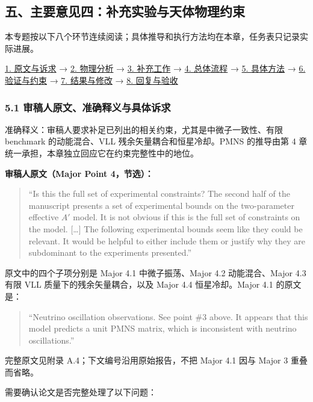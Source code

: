 \documentclass[
  chinese,
  UTF8]{ctexart}
\begin{document}
\subsection{五、主要意见四：补充实验与天体物理约束}\label{major-4}

本专题按以下八个环节连续阅读；具体推导和执行方法均在本章，任务表只记录实际进展。

\hyperref[major-4-step-1]{1. 原文与诉求} → \hyperref[major-4-step-2]{2.
物理分析} → \hyperref[major-4-step-3]{3. 补充工作} →
\hyperref[major-4-step-4]{4. 总体流程} → \hyperref[major-4-step-5]{5.
具体方法} → \hyperref[major-4-step-6]{6. 验证与约束} →
\hyperref[major-4-step-7]{7. 结果与修改} → \hyperref[major-4-step-8]{8.
回复与验收}

\subsubsection{5.1 审稿人原文、准确释义与具体诉求}\label{major-4-step-1}

准确释义：审稿人要求补足已列出的相关约束，尤其是中微子一致性、有限
benchmark 的动能混合、VLL 残余矢量耦合和恒星冷却。PMNS 的推导由第 4
章统一承担，本章独立回应它在约束完整性中的地位。

\textbf{审稿人原文（Major Point 4，节选）：}

\begin{quote}
``Is this the full set of experimental constraints? The second half of
the manuscript presents a set of experimental bounds on the
two-parameter effective \(A'\) model. It is not obvious if this is the
full set of constraints on the model. {[}\ldots{]} The following
experimental bounds seem like they could be relevant. It would be
helpful to either include them or justify why they are subdominant to
the experiments presented.''
\end{quote}

原文中的四个子项分别是 Major 4.1 中微子振荡、Major 4.2 动能混合、Major
4.3 有限 VLL 质量下的残余矢量耦合，以及 Major 4.4 恒星冷却。Major 4.1
的原文是：

\begin{quote}
``Neutrino oscillation observations. See point \#3 above. It appears
that this model predicts a unit PMNS matrix, which is inconsistent with
neutrino oscillations.''
\end{quote}

完整原文见附录 A.4；下文编号沿用原始报告，不把 Major 4.1 因与 Major 3
重叠而省略。

需要确认论文是否完整处理了以下问题：
\end{document}
